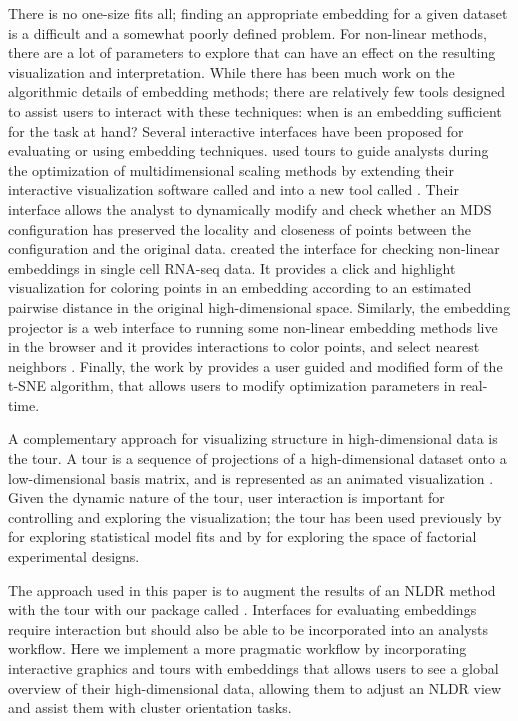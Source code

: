 \documentclass[article,notitle]{jdssv}
\begin{document}
There is no one-size fits all; finding an appropriate embedding for a given
dataset is a difficult and a somewhat poorly defined problem. For non-linear
methods, there are a lot of parameters to explore that can have an effect on
the resulting visualization and interpretation.
While there has been much work on the algorithmic details of
embedding methods; there are relatively few tools designed to assist users
to interact with these techniques: when is an embedding sufficient for the
task at hand? Several
interactive interfaces have been proposed for evaluating or using embedding
techniques. \citet{Buja2008-fn} used tours to guide analysts during the optimization
of multidimensional scaling methods by extending their interactive visualization
software called  and  into a new tool called 
\citep{Swayne1998-uq, Swayne2003-qd, Swayne2004-ua}.
Their interface allows the analyst to dynamically modify and check whether
an MDS configuration has preserved the locality and closeness
of points between the configuration and the original data.
\citet{Ovchinnikova2020-sy} created the  interface for checking
non-linear embeddings in single cell RNA-seq data. It provides a click and
highlight visualization for coloring points in an embedding according to an
estimated pairwise distance in the original high-dimensional space.
Similarly, the  embedding projector is a web interface to
running some non-linear embedding methods live in the browser and it
provides interactions to color points, and select nearest neighbors
\citep{Smilkov2016-hp}. Finally, the work by \citet{Pezzotti2017-cz} provides a user
guided and modified form of the t-SNE algorithm, that allows users to modify
optimization parameters in real-time.

A complementary approach for visualizing structure in high-dimensional data is
the tour. A tour is a sequence of projections of a high-dimensional dataset
onto a low-dimensional basis matrix, and is represented as an
animated visualization \citep{Asimov1985-vp, Buja1986-zr}. Given the dynamic
nature of the tour, user interaction is important for controlling and
exploring the visualization; the tour has been used previously by
\citet{Wickham2015-cx} for exploring statistical model fits and by \citet{Buja1996-fk} for
exploring the space of factorial experimental designs.

The approach used in this paper is to augment the results of an NLDR method with the tour with our package called . Interfaces for evaluating
embeddings require interaction but should also be able to be incorporated into
an analysts workflow. Here we implement a more pragmatic workflow by
incorporating interactive graphics and tours with embeddings that allows users
to see a global overview of their high-dimensional data, allowing them to
adjust an NLDR view and assist them with cluster orientation tasks.
\end{document}
